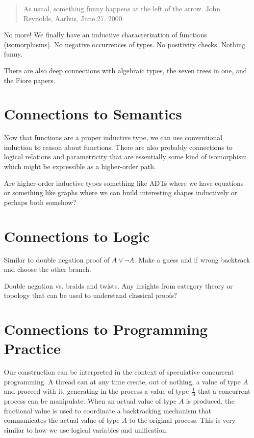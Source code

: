 \documentclass[11pt]{article}
\begin{document}
\begin{quote} 
As usual, something funny happens at the left of the arrow. John Reynolds,
Aarhus, June 27, 2000.~\cite{danvypage} 
\end{quote}

No more! We finally have an inductive characterization of functions
(isomorphisms). No negative occurrences of types. No positivity
checks. Nothing funny.

There are also deep connections with algebraic types, the seven trees in one,
and the Fiore papers.

\section{Connections to Semantics} 

Now that functions are a proper inductive type, we can use conventional
induction to reason about functions. There are also probably connections to
logical relations and parametricity that are essentially some kind of
isomorphism which might be expressible as a higher-order path.

Are higher-order inductive types something like ADTs where we have equations
or something like graphs where we can build interesting shapes inductively or
perhaps both somehow?

\section{Connections to Logic} 

Similar to double negation proof of $A \vee \neg A$. Make a guess and if
wrong backtrack and choose the other branch.

Double negation vs. braids and twists. Any insights from category theory or
topology that can be used to understand classical proofs?

\section{Connections to Programming Practice} 

Our construction can be interpreted in the context of speculative concurrent
programming. A thread can at any time create, out of nothing, a value of type
$A$ and proceed with it, generating in the process a value of type
$\frac{1}{A}$ that a concurrent process can be manipulate. When an actual
value of type $A$ is produced, the fractional value is used to coordinate a
backtracking mechanism that communicates the actual value of type $A$ to the
original process. This is very similar to how we use logical variables and
unification.
\end{document}
